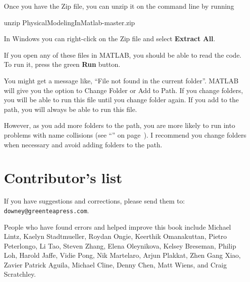 Once you have the Zip file, you can unzip it on the command line by running

\begin{code}
unzip PhysicalModelingInMatlab-master.zip
\end{code}

In Windows you can right-click on the Zip file and select \textbf{Extract All}.

If you open any of these files in MATLAB, you should be able to read the code.  To run it, press the green \textbf{Run} button.

You might get a message like, ``File not found in the current folder''.
MATLAB will give you the option to Change Folder or Add to Path.  If you change folders, you will be able to run this file until you change folder again.  If you add to the path, you will always be able to run this file.

However, as you add more folders to the path, you are more likely to run into problems with name collisions (see ``'' on page~\pageref{collision}).
I recommend you change folders when necessary and avoid adding folders to the path.


\newpage

\section*{Contributor's list}

If you have suggestions and corrections, please send them to:\\
\verb"downey@greenteapress.com".


People who have found errors and helped improve this book include
Michael Lintz, 
Kaelyn Stadtmueller, 
Roydan Ongie, 
Keerthik Omanakuttan, 
Pietro Peterlongo, 
Li Tao, 
Steven Zhang, 
Elena Oleynikova, 
Kelsey Breseman, 
Philip Loh, 
Harold Jaffe, 
Vidie Pong, 
Nik Martelaro, 
Arjun Plakkat, 
Zhen Gang Xiao, 
Zavier Patrick Aguila, 
Michael Cline,
Denny Chen,
Matt Wiens,
and Craig Scratchley.

\newpage

